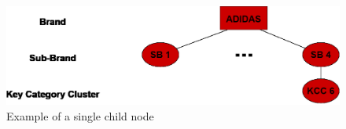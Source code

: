 \begin{figure}[H]
\centering
  \includegraphics[width=.7\linewidth]{figures/article_tree_single_childnode.eps}
  \caption{Example of a single child node}
  \label{fig:single_childnode}
\end{figure} 










